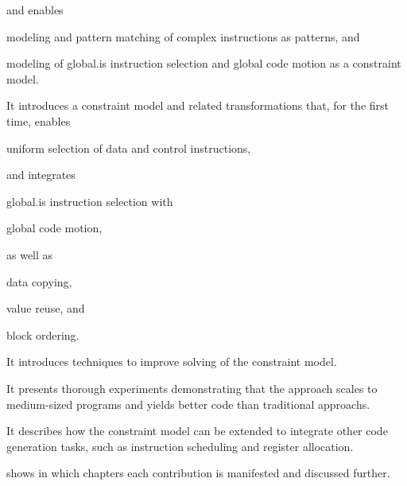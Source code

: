 \begin{contributions}
    and enables
    \begin{contributions}[resume]
      \item {}
        modeling and pattern matching of complex \glspl{instruction} as
        \glspl{pattern}, and
      \item {}
        modeling of \gls{global.is} \gls{instruction selection} and \gls{global
          code motion} as a \gls{constraint model}.
    \end{contributions}
  \item {}
    It introduces a \gls{constraint model} and related transformations that,
    for the first time, enables
    \begin{contributions}
      \item {}
        uniform selection of data and control \glspl{instruction},
    \end{contributions}
    and integrates
    \begin{contributions}[resume]
      \item {}
        \gls{global.is} \gls{instruction selection} with
      \item {}
        \gls{global code motion},
    \end{contributions}
    as well as
    \begin{contributions}[resume]
      \item {}
        \gls{data copying},
      \item {}
        \gls{value reuse}, and
      \item {}
        \gls{block ordering}.
    \end{contributions}
  \item {}
    It introduces techniques to improve solving of the \gls{constraint model}.
  \item {}
    It presents thorough experiments demonstrating that the approach scales to
    medium-sized \glspl{program} and yields better code than \glspl{traditional
      approach}.
  \item {}
    It describes how the \gls{constraint model} can be extended to integrate
    other \gls{code generation} tasks, such as \gls{instruction scheduling} and
    \gls{register allocation}.
\end{contributions}
%
 shows in which chapters each contribution
is manifested and discussed further.

